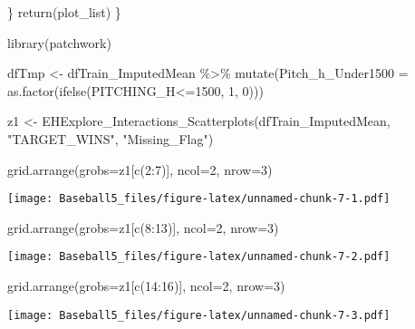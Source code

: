 \documentclass[
]{article}
\newenvironment{Shaded}{\begin{snugshade}}{\end{snugshade}}
\newcommand{\AttributeTok}[1]{\textcolor[rgb]{0.77,0.63,0.00}{#1}}
\newcommand{\DecValTok}[1]{\textcolor[rgb]{0.00,0.00,0.81}{#1}}
\newcommand{\FunctionTok}[1]{\textcolor[rgb]{0.00,0.00,0.00}{#1}}
\newcommand{\NormalTok}[1]{#1}
\newcommand{\OtherTok}[1]{\textcolor[rgb]{0.56,0.35,0.01}{#1}}
\newcommand{\SpecialCharTok}[1]{\textcolor[rgb]{0.00,0.00,0.00}{#1}}
\newcommand{\StringTok}[1]{\textcolor[rgb]{0.31,0.60,0.02}{#1}}
\begin{document}
\begin{Shaded}
\begin{Highlighting}[]
\NormalTok{\}}
  \FunctionTok{return}\NormalTok{(plot\_list)}
\NormalTok{\}}

\FunctionTok{library}\NormalTok{(patchwork)}

\NormalTok{dfTmp }\OtherTok{\textless{}{-}}\NormalTok{ dfTrain\_ImputedMean }\SpecialCharTok{\%\textgreater{}\%}
  \FunctionTok{mutate}\NormalTok{(}\AttributeTok{Pitch\_h\_Under1500 =} \FunctionTok{as.factor}\NormalTok{(}\FunctionTok{ifelse}\NormalTok{(PITCHING\_H}\SpecialCharTok{\textless{}=}\DecValTok{1500}\NormalTok{, }\DecValTok{1}\NormalTok{, }\DecValTok{0}\NormalTok{)))}

\NormalTok{z1 }\OtherTok{\textless{}{-}} \FunctionTok{EHExplore\_Interactions\_Scatterplots}\NormalTok{(dfTrain\_ImputedMean, }\StringTok{"TARGET\_WINS"}\NormalTok{, }\StringTok{"Missing\_Flag"}\NormalTok{)}

\FunctionTok{grid.arrange}\NormalTok{(}\AttributeTok{grobs=}\NormalTok{z1[}\FunctionTok{c}\NormalTok{(}\DecValTok{2}\SpecialCharTok{:}\DecValTok{7}\NormalTok{)],  }\AttributeTok{ncol=}\DecValTok{2}\NormalTok{, }\AttributeTok{nrow=}\DecValTok{3}\NormalTok{)}
\end{Highlighting}
\end{Shaded}

\texttt{[image: Baseball5\_files/figure-latex/unnamed-chunk-7-1.pdf]}

\begin{Shaded}
\begin{Highlighting}[]
\FunctionTok{grid.arrange}\NormalTok{(}\AttributeTok{grobs=}\NormalTok{z1[}\FunctionTok{c}\NormalTok{(}\DecValTok{8}\SpecialCharTok{:}\DecValTok{13}\NormalTok{)],  }\AttributeTok{ncol=}\DecValTok{2}\NormalTok{, }\AttributeTok{nrow=}\DecValTok{3}\NormalTok{)}
\end{Highlighting}
\end{Shaded}

\texttt{[image: Baseball5\_files/figure-latex/unnamed-chunk-7-2.pdf]}

\begin{Shaded}
\begin{Highlighting}[]
\FunctionTok{grid.arrange}\NormalTok{(}\AttributeTok{grobs=}\NormalTok{z1[}\FunctionTok{c}\NormalTok{(}\DecValTok{14}\SpecialCharTok{:}\DecValTok{16}\NormalTok{)],  }\AttributeTok{ncol=}\DecValTok{2}\NormalTok{, }\AttributeTok{nrow=}\DecValTok{3}\NormalTok{)}
\end{Highlighting}
\end{Shaded}

\texttt{[image: Baseball5\_files/figure-latex/unnamed-chunk-7-3.pdf]}
\end{document}
